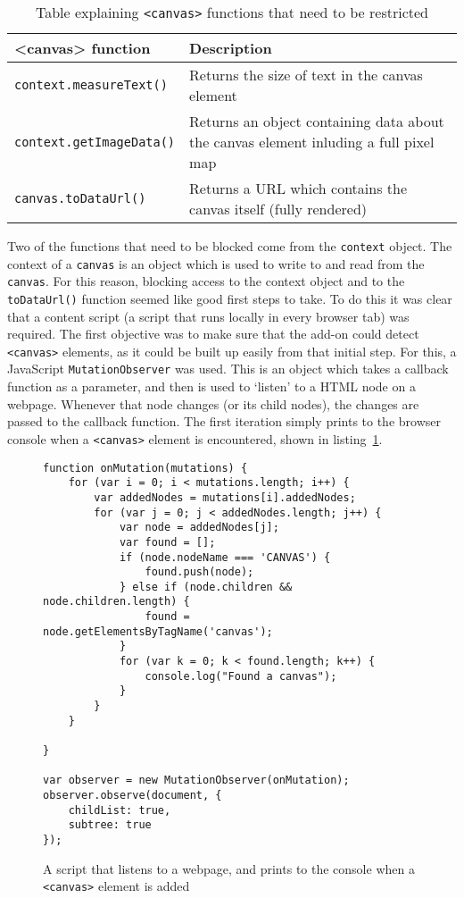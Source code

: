 \begin{table}[h!]
\centering
\begin{tabular}{| p{6cm} | p{8cm} |}
    \hline
    \textbf{<canvas> function} & \textbf{Description} \\ \hline
    \texttt{context.measureText()} & {Returns the size of text in the canvas element} \\ \hline
    \texttt{context.getImageData()} & {Returns an object containing data about \newline the canvas element inluding a full pixel map} \\ \hline
    \texttt{canvas.toDataUrl()} & {Returns a URL which contains the canvas \newline itself (fully rendered)} \\
    \hline
\end{tabular}
\caption{Table explaining \texttt{<canvas>} functions that need to be restricted}
\label{tab:canvas-methods}
\end{table}

Two of the functions that need to be blocked come from the \texttt{context} object.
The context of a \texttt{canvas} is an object which is used to write to and read from the \texttt{canvas}.
For this reason, blocking access to the context object and to the \texttt{toDataUrl()} function seemed like good first steps to take.
To do this it was clear that a content script (a script that runs locally in every browser tab) was required.
The first objective was to make sure that the add-on could detect \texttt{<canvas>} elements, as it could be built up easily from that initial step.
For this, a JavaScript \texttt{MutationObserver} was used.
This is an object which takes a callback function as a parameter, and then is used to `listen' to a HTML node on a webpage.
Whenever that node changes (or its child nodes), the changes are passed to the callback function.
The first iteration simply prints to the browser console when a \texttt{<canvas>} element is encountered, shown in listing~\ref{lst:canvas-logger}.

\begin{figure}[h!]
\begin{lstlisting}
function onMutation(mutations) {
    for (var i = 0; i < mutations.length; i++) {
        var addedNodes = mutations[i].addedNodes;
        for (var j = 0; j < addedNodes.length; j++) {
            var node = addedNodes[j];
            var found = [];
            if (node.nodeName === 'CANVAS') {
                found.push(node);
            } else if (node.children && node.children.length) {
                found = node.getElementsByTagName('canvas');
            }
            for (var k = 0; k < found.length; k++) {
                console.log("Found a canvas");
            }
        }
    }

}

var observer = new MutationObserver(onMutation);
observer.observe(document, {
    childList: true,
    subtree: true
});
\end{lstlisting}
\caption{A script that listens to a webpage, and prints to the console when a \texttt{<canvas>} element is added}
\label{lst:canvas-logger}
\end{figure}

